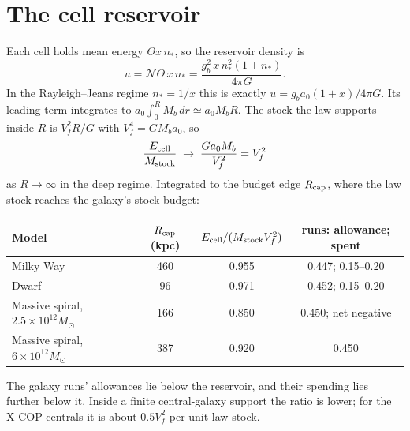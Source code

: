\documentclass[11pt]{article}
\begin{document}
\section{The cell reservoir}
Each cell holds mean energy $\Theta x\,n_*$, so the reservoir density is
\[
u=\mathcal N\Theta\,x\,n_*=\frac{g_b^2\,x\,n_*^2(1+n_*)}{4\pi G}.
\]
In the Rayleigh--Jeans regime $n_*=1/x$ this is exactly $u=g_ba_0(1+x)/4\pi G$. Its
leading term integrates to $a_0\int_0^RM_b\,dr\simeq a_0M_bR$. The stock the law supports
inside $R$ is $V_f^2R/G$ with $V_f^4=GM_ba_0$, so
\[
\frac{E_{\rm cell}}{M_{\rm stock}}\;\to\;\frac{G a_0 M_b}{V_f^2}=V_f^2
\]
as $R\to\infty$ in the deep regime. Integrated to the budget edge $R_{\rm cap}$, where
the law stock reaches the galaxy's stock budget:
\begin{center}
\begin{tabular}{lccc}
\toprule
Model & $R_{\rm cap}$ (kpc) & $E_{\rm cell}/(M_{\rm stock}V_f^2)$ & runs: allowance; spent\\
\midrule
Milky Way & 460 & 0.955 & 0.447; 0.15--0.20\\
Dwarf & 96 & 0.971 & 0.452; 0.15--0.20\\
Massive spiral, $2.5\times10^{12}M_\odot$ & 166 & 0.850 & 0.450; net negative\\
Massive spiral, $6\times10^{12}M_\odot$ & 387 & 0.920 & 0.450\\
\bottomrule
\end{tabular}
\end{center}
The galaxy runs' allowances lie below the reservoir, and their spending lies further
below it. Inside a finite central-galaxy support the ratio is lower; for the X-COP
centrals it is about $0.5V_f^2$ per unit law stock.
\end{document}
